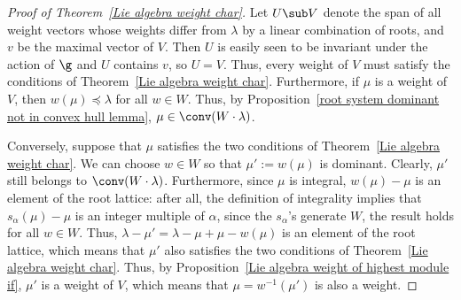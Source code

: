 \begin{proof}[Proof of Theorem~\ref{Lie algebra weight char}]
Let $U\sub V$ denote the span of all weight vectors whose weights differ from $\lambda$ by a linear combination of roots, and $v$ be the maximal vector of $V$. Then $U$ is easily seen to be invariant under the action of $\g$ and $U$ contains $v$, so $U=V$. Thus, every weight of $V$ must satisfy the conditions of Theorem~\ref{Lie algebra weight char}. Furthermore, if $\mu$ is a weight of $V$, then $w(\mu)\preceq\lambda$ for all $w\in W$. Thus, by Proposition~\ref{root system dominant not in convex hull lemma}, $\mu\in\conv(W\cdot\lambda)$.\par
Conversely, suppose that $\mu$ satisfies the two conditions of Theorem~\ref{Lie algebra weight char}. We can choose $w\in W$ so that $\mu':=w(\mu)$ is dominant. Clearly, $\mu'$ still belongs to $\conv(W\cdot\lambda)$. Furthermore, since $\mu$ is integral, $w(\mu)-\mu$ is an element of the root lattice: after all, the definition of integrality implies that $s_\alpha(\mu)-\mu$ is an integer multiple of $\alpha$, since the $s_\alpha$'s generate $W$, the result holds for all $w\in W$. Thus, $\lambda-\mu'=\lambda-\mu+\mu-w(\mu)$ is an element of the root lattice, which means that $\mu'$ also satisfies the two conditions of Theorem~\ref{Lie algebra weight char}. Thus, by Proposition~\ref{Lie algebra weight of highest module if}, $\mu'$ is a weight of $V$, which means that $\mu=w^{-1}(\mu')$ is also a weight.
\end{proof}
